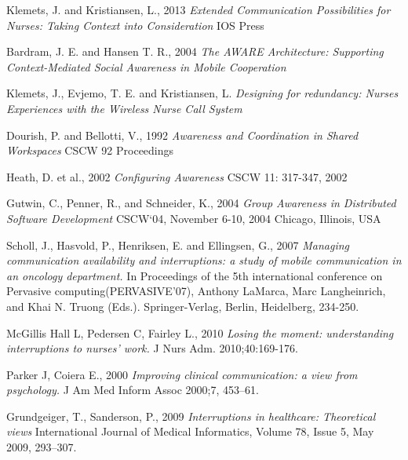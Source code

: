 \documentclass[b5paper, 11pt, norsk]{MScthesisITEM}
\begin{document}

%
%

\begin{thebibliography}{99}

Klemets, J. and Kristiansen, L., 2013
\emph{Extended Communication Possibilities for Nurses: Taking Context into Consideration}
IOS Press
  

Bardram, J. E. and Hansen T. R., 2004
\emph{The AWARE Architecture: Supporting Context-Mediated Social Awareness in Mobile Cooperation}

Klemets, J., Evjemo, T. E. and Kristiansen, L.
\emph{Designing for redundancy: Nurses Experiences with the Wireless Nurse Call System}

Dourish, P. and Bellotti, V., 1992
\emph{Awareness and Coordination in Shared Workspaces}
CSCW 92 Proceedings

Heath, D. et al., 2002
\emph{Configuring Awareness}
CSCW 11: 317-347, 2002

Gutwin, C., Penner, R., and Schneider, K., 2004
\emph{Group Awareness in Distributed Software Development}
CSCW`04, November 6-10, 2004 Chicago, Illinois, USA

Scholl, J., Hasvold, P., Henriksen, E. and Ellingsen, G., 2007
\emph {Managing communication availability and interruptions: a study of mobile communication in an oncology department.} 
In Proceedings of the 5th international conference on Pervasive computing(PERVASIVE'07), Anthony LaMarca, Marc Langheinrich, and Khai N. Truong (Eds.). Springer-Verlag, Berlin, Heidelberg, 234-250.

McGillis Hall L, Pedersen C, Fairley L., 2010
\emph {Losing the moment: understanding interruptions to nurses' work.}
J Nurs Adm. 2010;40:169-176.

Parker J, Coiera E., 2000
\emph {Improving clinical communication: a view from psychology.} 
J Am Med Inform Assoc 2000;7, 453–61.

Grundgeiger, T., Sanderson, P., 2009
\emph {Interruptions in healthcare: Theoretical views}
International Journal of Medical Informatics, Volume 78, Issue 5, May 2009, 293–307.


\end{thebibliography}
\end{document}

